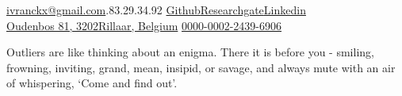 \documentclass[10pt,a4paper]{article}
\begin{document}
\sloppy  %

%

\nobreakvspace{0.3em}  %

\noindent\href{mailto:ivranckx@gmail.com}{ivranckx\mbox{}@\mbox{}gmail.com}.83.29.34.92\sbull
\href{https://github.com/ivranckx}{Github}\sbull \href{https://www.researchgate.net/profile/Iwein_Vranckx}{Researchgate}\sbull \href{http://linkedin.com/in/ivranckx}{Linkedin} \\
\href{https://www.google.com/maps/place/3202+Rillaar}{Oudenbos  81, 
3202\thinspace Rillaar, Belgium}\sbull%
\href{https://orcid.org/0000-0002-2439-6906}{\textcolor{orcidlogocol}{\aiOrcid} \hspace{0.2mm} 0000-0002-2439-6906}
\spacedhrule{0.9em}{-0.4em}  %
\begin{fquote}
	\large	Outliers are like thinking about an enigma. There it is before you - smiling, frowning, inviting, grand, mean, insipid, or savage, and always mute with an air of whispering, ‘Come and find out'.
\end{fquote}
\end{document}
